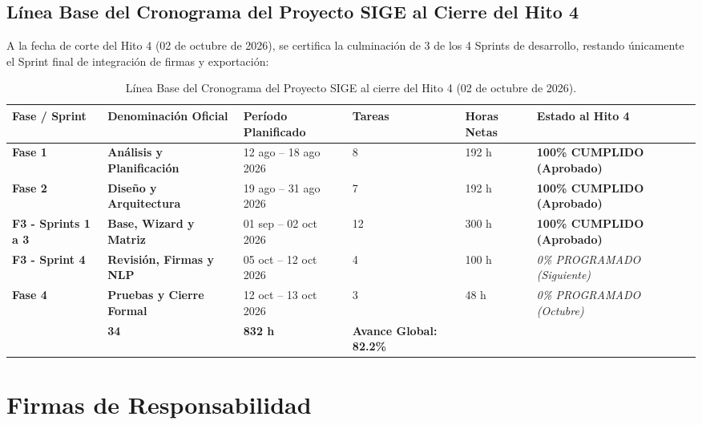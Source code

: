 \documentclass[12pt,a4paper]{article}
\begin{document}
\subsection{Línea Base del Cronograma del Proyecto SIGE al Cierre del Hito 4}
A la fecha de corte del Hito 4 (02 de octubre de 2026), se certifica la culminación de 3 de los 4 Sprints de desarrollo, restando únicamente el Sprint final de integración de firmas y exportación:

\begin{table}[H]
\centering
\small
\renewcommand{\arraystretch}{1.2}
\begin{tabularx}{\textwidth}{|>{\hsize=0.6\hsize\centering\arraybackslash\footnotesize}X|>{\hsize=1.3\hsize\raggedright\arraybackslash\bfseries\footnotesize}X|>{\hsize=1.1\hsize\centering\arraybackslash\footnotesize}X|>{\hsize=0.5\hsize\centering\arraybackslash\footnotesize}X|>{\hsize=0.6\hsize\centering\arraybackslash\footnotesize}X|>{\hsize=1.9\hsize\centering\arraybackslash\footnotesize}X|}
\hline
\rowcolor{tableheader}
\textbf{Fase / Sprint} & \textbf{Denominación Oficial} & \textbf{Período Planificado} & \textbf{Tareas} & \textbf{Horas Netas} & \textbf{Estado al Hito 4} \\
\hline
\textbf{Fase 1} & Análisis y Planificación & 12 ago -- 18 ago 2026 & 8 & 192 h & \textbf{100\% CUMPLIDO (Aprobado)} \\
\hline
\textbf{Fase 2} & Diseño y Arquitectura & 19 ago -- 31 ago 2026 & 7 & 192 h & \textbf{100\% CUMPLIDO (Aprobado)} \\
\hline
\textbf{F3 - Sprints 1 a 3} & Base, Wizard y Matriz & 01 sep -- 02 oct 2026 & 12 & 300 h & \textbf{100\% CUMPLIDO (Aprobado)} \\
\hline
\textbf{F3 - Sprint 4} & Revisión, Firmas y NLP & 05 oct -- 12 oct 2026 & 4 & 100 h & \textit{0\% PROGRAMADO (Siguiente)} \\
\hline
\textbf{Fase 4} & Pruebas y Cierre Formal & 12 oct -- 13 oct 2026 & 3 & 48 h & \textit{0\% PROGRAMADO (Octubre)} \\
\hline
\multicolumn{3}{|r|}{\textbf{TOTAL GENERAL DEL PROYECTO:}} & \textbf{34} & \textbf{832 h} & \textbf{Avance Global: 82.2\%} \\
\hline
\end{tabularx}
\caption{Línea Base del Cronograma del Proyecto SIGE al cierre del Hito 4 (02 de octubre de 2026).}
\label{tab:linea_base_hito4}
\end{table}

\section{Firmas de Responsabilidad}
\end{document}
